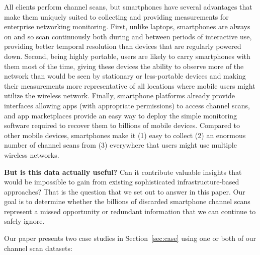 All \wifi{} clients perform channel scans, but smartphones have several
advantages that make them uniquely suited to collecting and providing
measurements for enterprise networking monitoring. First, unlike laptops,
smartphones are always on and so scan continuously both during and between
periods of interactive use, providing better temporal resolution than devices
that are regularly powered down. Second, being highly portable, users are
likely to carry smartphones with them most of the time, giving these devices
the ability to observe more of the network than would be seen by stationary
or less-portable devices and making their measurements more representative of
all locations where mobile users might utilize the wireless network. Finally,
smartphone platforms already provide interfaces allowing apps (with
appropriate permissions) to access channel scans, and app marketplaces
provide an easy way to deploy the simple monitoring software required to
recover them to billions of mobile devices. Compared to other mobile devices,
smartphones make it (1) easy to collect (2) an enormous number of channel
scans from (3) everywhere that users might use multiple wireless networks.

\textbf{But is this data actually useful?} Can it contribute valuable
insights that would be impossible to gain from existing sophisticated
infrastructure-based approaches? That is the question that we set out to
answer in this paper. Our goal is to determine whether the billions of
discarded smartphone channel scans represent a missed opportunity or
redundant information that we can continue to safely ignore.


Our paper presents two case studies in Section~\ref{sec:case} using one or
both of our channel scan datasets:

